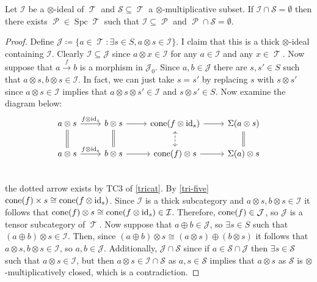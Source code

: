 \documentclass[11pt]{article}
\DeclareMathOperator{\TT}{\mathcal{T}}
\DeclareMathOperator{\cP}{\mathcal{P}}
\DeclareMathOperator{\spc}{Spc}
\begin{document}
\begin{lem}\label{lem:PrimeComplement}
Let $\mathcal{I}$ be a $\otimes$-ideal of $\TT$ and $\mathcal{S} \subseteq \TT$ a $\otimes$-multiplicative subset. If $\mathcal{I} \cap \mathcal{S} = \emptyset$ then there exists $\cP \in \spc \TT$ such that $\mathcal{I} \subseteq \cP$ and $\cP \cap \mathcal{S} = \emptyset$.
\end{lem}
\begin{proof}
Define $\mathcal{J} \coloneqq \{a \in \TT: \exists s \in S, a \otimes s \in \mathcal{I}\}$. I claim that this is a thick $\otimes$-ideal containing $\mathcal{I}$. Clearly $\mathcal{I} \subseteq \mathcal{J}$ since $a \otimes x \in \mathcal{I}$ for any $a \in \mathcal{I}$ and any $x \in \TT$. Now suppose that $a \xrightarrow{f} b$ is a morphism in $\mathcal{J}_0$. Since $a,b \in \mathcal{J}$ there are $s,s' \in S$ such that $a \otimes s, b \otimes s \in \mathcal{I}$. In fact, we can just take $s = s'$ by replacing $s$ with $s \otimes s'$ since $a \otimes s \in \mathcal{I}$ implies that $a \otimes s \otimes s' \in \mathcal{I}$ and $s \otimes s' \in S$. Now examine the diagram below:
\[\begin{tikzcd}
a \otimes s \ar[r,"f \otimes \id_s"] \ar[d,equal] & b \otimes s \ar[d,equal] \ar[r] & \cone(f \otimes \id_s) \ar[r] \ar[d,dashed,leftrightarrow] & \Sigma(a \otimes s) \ar[d, equal]\\
 a \otimes s \ar[r,"f \otimes \id_s"]& b \otimes s \ar[r] & \cone(f) \otimes s \ar[r] &  \Sigma(a) \otimes s \\
\end{tikzcd}\]
the dotted arrow exists by TC3 of \autoref{tricat}. By \autoref{tri-five} $\operatorname{cone}(f) \times s \cong \operatorname{cone}(f \otimes \operatorname{id}_s)$. Since $\mathcal{I}$ is a thick subcategory and $a \otimes s, b \otimes s \in \mathcal{I}$ it follows that $\operatorname{cone}(f) \otimes s \cong \operatorname{cone}(f \otimes \operatorname{id}_s) \in \mathcal{I}$. Therefore, $\operatorname{cone}(f) \in \mathcal{J}$, so $\mathcal{J}$ is a tensor subcategory of $\TT$. Now suppose that $a \oplus b \in \mathcal{J} $, so $\exists s \in S $ such that $(a \oplus b) \otimes s \in \mathcal{I}$. Then, since $(a \oplus b) \otimes s \cong (a \otimes s) \oplus (b \otimes s)$ it follows that $a \otimes s, b \otimes s \in \mathcal{I}$, so $a,b \in \mathcal{J}$. Additionally, $\mathcal{J} \cap \mathcal{S}$ since if $a \in \mathcal{S} \cap \mathcal{J}$ then $\exists s \in \mathcal{S}$ such that $a \otimes s \in \mathcal{I}$, but then $a \otimes s \in \mathcal{I} \cap \mathcal{S}$ as $a,s \in \mathcal{S}$ implies that $a \otimes s$ as $\mathcal{S}$ is $\otimes$-multiplicatively closed, which is a contradiction.


\end{proof}
\end{document}
